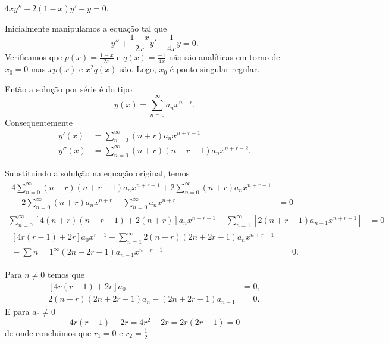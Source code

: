 \documentclass[a4paper,12pt, leqno, answers]{exam}
\begin{document}
\begin{questions}
    \question $4 x y'' + 2 \left( 1 - x \right) y' - y = 0$.
    \begin{solution}
        Inicialmente manipulamos a equa\c{c}\~{a}o tal que
        \[
        y'' + \frac{1 - x}{2 x} y' - \frac{1}{4x} y = 0.
        \]
        Verificamos que $p(x) = \frac{1 - x}{2x}$ e $q(x) = \frac{-1}{4x}$ n\~{a}o s\~{a}o anal\'{i}ticas em torno de $x_0 = 0$ mas $x p(x)$ e $x^2 q(x)$ s\~{a}o. Logo, $x_0$ \'{e} ponto singular regular.

        Ent\~{a}o a solu\c{c}\~{a}o por s\'{e}rie \'{e} do tipo
        \[
        y\left( x \right) = \sum_{n = 0}^\infty a_n x^{n + r}.
        \]
        Consequentemente
        \begin{align*}
            y'(x) &= \sum_{n = 0}^\infty \left( n + r \right) a_n x^{n + r - 1} \\
            y''(x) &= \sum_{n = 0}^\infty \left( n + r \right) \left( n + r - 1 \right) a_n x^{n + r - 2}.
        \end{align*}

        Substituindo a solul\c{c}\~{a}o na equa\c{c}\~{a}o original, temos
        \begin{align*}
            \begin{split}
                4 \sum_{n = 0}^\infty \left( n + r \right) \left( n + r - 1 \right) a_n x^{n + r - 1} + 2 \sum_{n = 0}^\infty \left( n + r \right) a_n x^{n + r - 1} \\ {}- 2 \sum_{n = 0}^\infty \left( n + r \right) a_n x^{n + r} - \sum_{n = 0}^\infty a_n x^{n + r} &= 0
            \end{split} \\
            \sum_{n = 0}^\infty \left[ 4 \left( n + r \right) \left( n + r - 1 \right) + 2 \left( n + r \right) \right] a_n x^{n + r - 1} - \sum_{n = 1}^\infty \left[ 2 \left( n + r - 1 \right) a_{n - 1} x^{n + r - 1} \right] &= 0 \\
            \begin{split}
                \left[ 4 r \left( r - 1 \right) + 2 r \right] a_0 x^{r - 1} + \sum_{n = 1}^\infty 2 \left( n + r \right) \left( 2 n + 2 r - 1 \right) a_n x^{n + r - 1} \\ {}- \sum{n = 1}^\infty \left( 2 n + 2 r - 1 \right) a_{n - 1} x^{n + r - 1} &= 0.
            \end{split}
        \end{align*}

        Para $n \neq 0$ temos que
        \begin{align*}
            \left[ 4 r \left( r - 1 \right) + 2 r \right] a_0 &= 0, \\
            2 \left( n + r \right) \left( 2n + 2 r - 1 \right) a_n - \left( 2 n + 2 r - 1 \right) a_{n - 1} &= 0.
        \end{align*}
        E para $a_0 \neq 0$
        \[
        4 r \left( r - 1 \right) + 2 r = 4r^2 - 2r = 2r \left( 2 r - 1 \right) = 0
        \]
        de onde concluimos que $r_1 = 0$ e $r_2 = \frac{1}{2}$.


\end{solution}
\end{questions}
\end{document}
